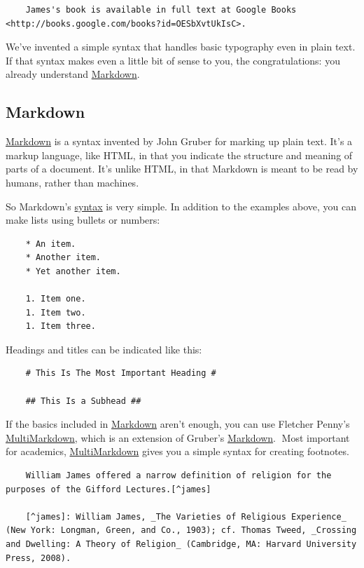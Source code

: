 \begin{verbatim}
    James's book is available in full text at Google Books <http://books.google.com/books?id=OESbXvtUkIsC>.
\end{verbatim}
We've invented a simple syntax that handles basic typography even in
plain text. If that syntax makes even a little bit of sense to you, the
congratulations: you already understand
\href{http://daringfireball.net/projects/markdown/}{Markdown}.

\subsection{Markdown}

\href{http://daringfireball.net/projects/markdown/}{Markdown} is a
syntax invented by John Gruber for marking up plain text. It's a markup
language, like HTML, in that you indicate the structure and meaning of
parts of a document. It's unlike HTML, in that Markdown is meant to be
read by humans, rather than machines.

So Markdown's
\href{http://daringfireball.net/projects/markdown/syntax}{syntax} is
very simple. In addition to the examples above, you can make lists using
bullets or numbers:

\begin{verbatim}
    * An item.
    * Another item.
    * Yet another item.

    1. Item one.
    1. Item two.
    1. Item three.
\end{verbatim}
Headings and titles can be indicated like this:

\begin{verbatim}
    # This Is The Most Important Heading #

    ## This Is a Subhead ##
\end{verbatim}
If the basics included in
\href{http://daringfireball.net/projects/markdown/}{Markdown} aren't
enough, you can use Fletcher Penny's
\href{http://fletcherpenney.net/multimarkdown/}{MultiMarkdown}, which is
an extension of Gruber's
\href{http://daringfireball.net/projects/markdown/}{Markdown}. Most
important for academics,
\href{http://fletcherpenney.net/multimarkdown/}{MultiMarkdown} gives you
a simple syntax for creating footnotes.

\begin{verbatim}
    William James offered a narrow definition of religion for the purposes of the Gifford Lectures.[^james]

    [^james]: William James, _The Varieties of Religious Experience_ (New York: Longman, Green, and Co., 1903); cf. Thomas Tweed, _Crossing and Dwelling: A Theory of Religion_ (Cambridge, MA: Harvard University Press, 2008).
\end{verbatim}
